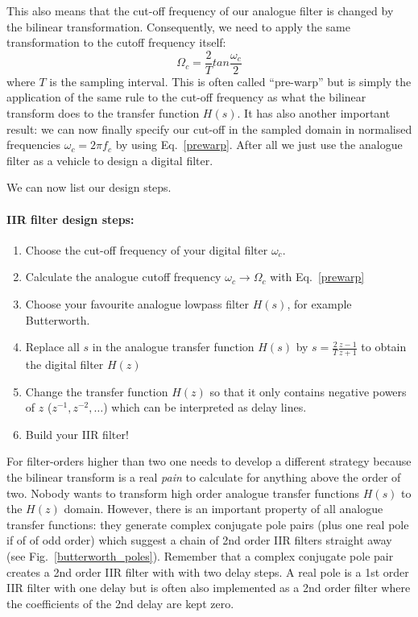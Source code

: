 \documentclass[12pt,a4paper]{article}
\begin{document}
This also means that the cut-off frequency of our analogue filter is changed
by the bilinear transformation. Consequently, we need to apply the same
transformation to the cutoff frequency itself:
\begin{equation}
\Omega_{c} = \frac{2}{T} tan \frac {\omega_{c}}{2}
\label{prewarp}
\end{equation}
where $T$ is the sampling interval. This is often called ``pre-warp''
but is simply the application of the same rule to the cut-off
frequency as what the bilinear transform does to the transfer function
$H(s)$. It has also another important result: we can now finally
specify our cut-off in the sampled domain in normalised frequencies
$\omega_{c} = 2\pi f_{c}$ by using Eq.~\ref{prewarp}. After all we
just use the analogue filter as a vehicle to design a digital filter.

We can now list our design steps.

\paragraph{IIR filter design steps:}
\begin{enumerate}
\item Choose the cut-off frequency of your digital filter $\omega_{c}$.
\item Calculate the analogue cutoff frequency $\omega_{c} \rightarrow
  \Omega_{c}$ with Eq.~\ref{prewarp}
\item Choose your favourite analogue lowpass filter $H(s)$,
for example Butterworth.
\item Replace all $s$ in the analogue transfer function
$H(s)$ by $s = \frac{2}{T} \frac{z - 1}{z + 1}$ 
to obtain the digital filter $H(z)$
\item Change the transfer function $H(z)$ so that it only contains
negative powers of $z$ ($z^{-1}, z^{-2}, \ldots$) which can be
interpreted as delay lines.
\item Build your IIR filter!
\end{enumerate}

For filter-orders higher than two one needs to develop a different
strategy because the bilinear transform is a real \textsl{pain} to
calculate for anything above the order of two. Nobody wants to
transform high order analogue transfer functions $H(s)$ to the $H(z)$
domain. However, there is an important property of all analogue
transfer functions: they generate complex conjugate pole pairs (plus
one real pole if of of odd order) which suggest a chain of 2nd order IIR
filters straight away (see Fig.~\ref{butterworth_poles}). Remember
that a complex conjugate pole pair creates a 2nd order IIR filter with
with two delay steps. A real pole is a 1st order IIR filter with one
delay but is often also implemented as a 2nd order filter where the
coefficients of the 2nd delay are kept zero.
\end{document}
